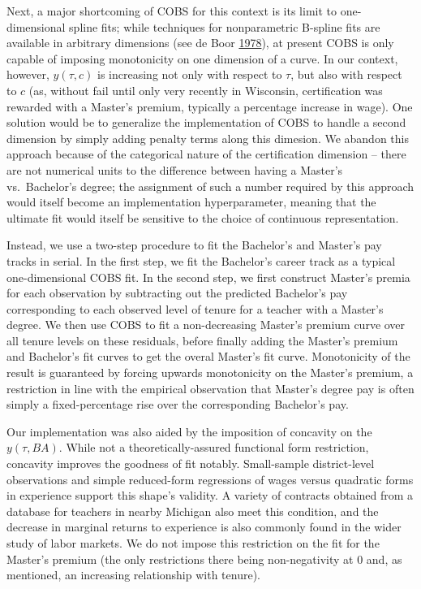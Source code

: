 \documentclass[12pt,]{article}
\begin{document}
Next, a major shortcoming of COBS for this context is its limit to
one-dimensional spline fits; while techniques for nonparametric B-spline
fits are available in arbitrary dimensions (see de Boor
\protect\hyperlink{ref-deboor}{1978}), at present COBS is only capable
of imposing monotonicity on one dimension of a curve. In our context,
however, \(y(\tau, c)\) is increasing not only with respect to \(\tau\),
but also with respect to \(c\) (as, without fail until only very
recently in Wisconsin, certification was rewarded with a Master's
premium, typically a percentage increase in wage). One solution would be
to generalize the implementation of COBS to handle a second dimension by
simply adding penalty terms along this dimesion. We abandon this
approach because of the categorical nature of the certification
dimension -- there are not numerical units to the difference between
having a Master's vs.~Bachelor's degree; the assignment of such a number
required by this approach would itself become an implementation
hyperparameter, meaning that the ultimate fit would itself be sensitive
to the choice of continuous representation.

Instead, we use a two-step procedure to fit the Bachelor's and Master's
pay tracks in serial. In the first step, we fit the Bachelor's career
track as a typical one-dimensional COBS fit. In the second step, we
first construct Master's premia for each observation by subtracting out
the predicted Bachelor's pay corresponding to each observed level of
tenure for a teacher with a Master's degree. We then use COBS to fit a
non-decreasing Master's premium curve over all tenure levels on these
residuals, before finally adding the Master's premium and Bachelor's fit
curves to get the overal Master's fit curve. Monotonicity of the result
is guaranteed by forcing upwards monotonicity on the Master's premium, a
restriction in line with the empirical observation that Master's degree
pay is often simply a fixed-percentage rise over the corresponding
Bachelor's pay.

Our implementation was also aided by the imposition of concavity on the
\(y(\tau, BA)\). While not a theoretically-assured functional form
restriction, concavity improves the goodness of fit notably.
Small-sample district-level observations and simple reduced-form
regressions of wages versus quadratic forms in experience support this
shape's validity. A variety of contracts obtained from a database for
teachers in nearby Michigan also meet this condition, and the decrease
in marginal returns to experience is also commonly found in the wider
study of labor markets. We do not impose this restriction on the fit for
the Master's premium (the only restrictions there being non-negativity
at 0 and, as mentioned, an increasing relationship with tenure).
\end{document}
